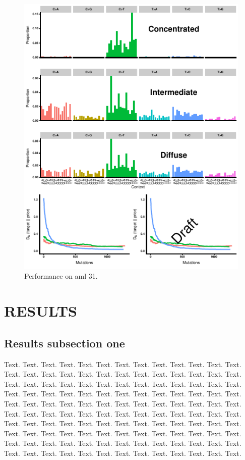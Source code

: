 \documentclass[a4,center,fleqn]{NAR}
\begin{document}
\begin{figure}[t]
\begin{center}
\includegraphics{figures/fig1.pdf}
\end{center}
\caption{Performance on aml 31.}
\label{NAR-fig1}
\end{figure}


\section{RESULTS}

\subsection{Results subsection one}

Text. Text. Text. Text. Text. Text. Text. Text. Text. Text. Text.
Text. Text. Text. Text. Text. Text. Text. Text. Text. Text. Text.
Text. Text. Text. Text. Text. Text. Text. Text. Text. Text. Text.
Text. Text. Text. Text. Text. Text. Text. Text. Text. Text. Text.
Text. Text. Text. Text. Text. Text. Text. Text. Text. Text. Text.
Text. Text. Text. Text. Text. Text. Text. Text. Text. Text. Text.
Text. Text. Text. Text. Text. Text. Text. Text. Text. Text. Text.
Text. Text. Text. Text. Text. Text. Text. Text. Text. Text. Text.
Text. Text. Text. Text. Text. Text. Text. Text. Text. Text. Text.
Text. Text. Text. Text. Text. Text. Text. Text. Text. Text. Text.
Text. Text. Text. Text. Text. Text. Text. Text. Text. Text. Text.
Text. Text. Text. Text. Text. Text. Text. Text. Text.
\end{document}
